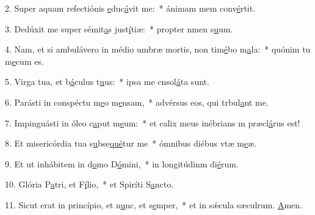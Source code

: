 2. Super aquam refectiónis \uline{e}duc\uline{á}vit me:~* ánimam mem conv\uline{é}rtit.\par 
3. Dedúxit me super sémit\uline{a}s just\uline{í}tiæ:~* propter nmen s\uline{u}um.\par 
4. Nam, et si ambulávero in médio umbræ mortis, non tim\uline{é}bo m\uline{a}la:~* quónim tu m\uline{e}cum es.\par 
5. Virga tua, et b\uline{á}culus t\uline{u}us:~* ipsa me cnsol\uline{á}ta sunt.\par 
6. Parásti in conspéctu m\uline{e}o m\uline{e}nsam,~* advérsus eos, qui trbul\uline{a}nt me.\par 
7. Impinguásti in óleo c\uline{a}put m\uline{e}um:~* et calix meus inébrians m præcl\uline{á}rus est!\par 
8. Et misericórdia tua s\uline{u}bse\uline{qué}tur me~* ómnibus diébus vtæ m\uline{e}æ.\par 
9. Et ut inhábitem in d\uline{o}mo D\uline{ó}mini,~* in longitúdinm di\uline{é}rum.\par 
10. Glória P\uline{a}tri, et F\uline{í}lio,~* et Spiríti S\uline{a}ncto.\par 
11. Sicut erat in princípio, et n\uline{u}nc, et s\uline{e}mper,~* et in sǽcula sæculrum. \uline{A}men.\par 
